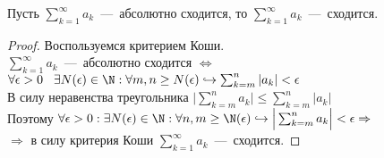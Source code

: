 \begin{lemma}
    Пусть $\sum_{k = 1}^{\infty} a_k$~---~абсолютно сходится, то $\sum_{k = 1}^{\infty} a_k$~---~сходится.
\end{lemma}
\begin{proof}
    Воспользуемся критерием Коши. \\
    $\sum_{k = 1}^{\infty} a_k$~---~абсолютно сходится $\Leftrightarrow$ $\forall \epsilon > 0 \hspace{0.3cm} \exists N(\epsilon) \in \N: \forall m, n \geq N(\epsilon) \hookrightarrow \sum_{k = m}^n |a_k| < \epsilon$ \\
    В силу неравенства треугольника $\Big|\sum_{k = m}^n a_k\Big| \leq \sum_{k = m}^n |a_k|$ \\
    Поэтому $\forall \epsilon > 0: \exists N(\epsilon) \in \N: \forall n, m \geq \N(\epsilon) \hookrightarrow \Big|\sum_{k = m}^n a_k \Big| < \epsilon \Rightarrow$ \\ $\Rightarrow$ в силу критерия Коши $\sum_{k = 1}^{\infty}a_k$~---~сходится.
\end{proof}

